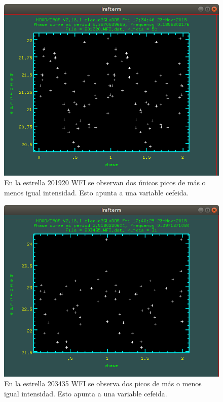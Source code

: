 \documentclass[12pt]{article}
\begin{document}
\begin{figure}[H]
  \centering
   \includegraphics[scale = 0.5]{201920.png}
  \caption{En la estrella 201920 WFI se observan dos únicos picos de más o menos igual intensidad. Esto apunta  a una variable cefeida.}
  \label{figura}
\end{figure}

\begin{figure}[H]
  \centering
  \includegraphics[scale = 0.5]{203435.png}
  \caption{En la estrella 203435 WFI se observa dos picos de más o menos igual intensidad. Esto apunta  a una variable cefeida.}
  \label{figura}
\end{figure}




%

\end{document}
